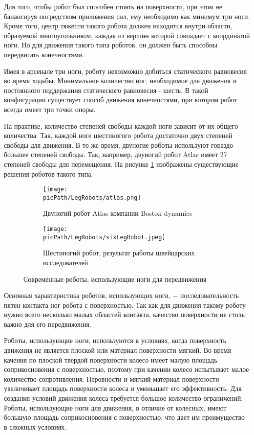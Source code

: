 \documentclass[oneside,final,14pt]{extreport}
\newcommand{\picPath}{img}
\begin{document}
Для того, чтобы робот был способен стоять на поверхности, при этом не балансируя посредством приложения сил, ему необходимо как минимум три ноги. Кроме того, центр тяжести такого робота должен находится внутри области, образуемой многоугольником, каждая из вершин которой совпадает с координатой ноги. Но для движения такого типа роботов, он должен быть способны передвигать конечностями. 

Имея в арсенале три ноги, роботу невозможно добиться статического равновесия во время ходьбы. Минимальное количество ног, необходимое для движения и постоянного поддержания статического равновесия - шесть. В такой конфигурации существует способ движения конечностями, при котором робот всегда имеет три точки опоры. 

На практике, количество степеней свободы каждой ноги зависит от их общего количества. Так, каждой ноге шестиногого робота достаточно двух степеней свободы для движения. В то же время, двуногие роботы используют гораздо большее степеней свободы. Так, например, двуногий робот Atlas имеет 27 степеней свободы для перемещения. На рисунке \ref{Figure:LegRobots} изображены существующие решения роботов такого типа.


\begin{figure}[H]
  \centering
  \begin{subfigure}[b]{0.4\linewidth}
   \texttt{[image: \\picPath/LegRobots/atlas.png]}
    \caption{ Двуногий робот Atlas компании Boston dynamics}
  \end{subfigure}
  \begin{subfigure}[b]{0.4\linewidth}
    \texttt{[image: \\picPath/LegRobots/sixLegRobot.jpeg]}
    \caption{ Шестиногий робот, результат работы швейцарских исследователей\cite{SixLegsRobots}}
  \end{subfigure}
  \caption{ Современные роботы, использующие ноги для передвижения}
  \label{Figure:LegRobots}
\end{figure}

Основная характеристика роботов, использующих ноги, $-$ последовательность пятен контакта ног робота с поверхностью. Так как для движения такому роботу нужно всего несколько малых областей контакта, качество поверхности не столь важно для его передвижения.

Роботы, использующие ноги, используются в условиях, когда поверхность движения не является плоской или материал поверхности мягкий. Во время качения по плоской твердой поверхности колесо имеет малую площадь соприкосновения с поверхностью, поэтому при качении колесо испытывает малое количество сопротивления. Неровности и мягкий материал поверхности увеличивает площадь поверхности колеса и уменьшает его эффективность. Для создания условий движения колеса требуется большое количество ограничений. Роботы, использующие ноги для движения, в отличие от колесных, имеют большую площадь соприкосновения с поверхностью, что дает им преимущество в сложных условиях.
\end{document}
